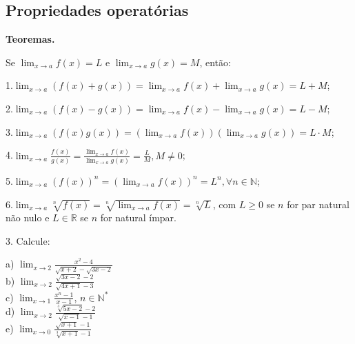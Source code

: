 \documentclass{article}
\begin{document}
{\begin{newpage}
\subsection{Propriedades operatórias}
\textbf{Teoremas.}
\par
\vspace{0.3cm}
Se $\displaystyle{\lim_{x\to a} f(x) = L}$ e $\displaystyle{\lim_{x\to a} g(x) = M}$, então:
\par
\vspace{0.2cm}
1.$\displaystyle{\lim_{x\to a} (f(x) + g(x)) = \lim_{x\to a} f(x) + \lim_{x\to a} g(x) = L + M}$;
\par
\vspace{0.2cm}
2.$\displaystyle{\lim_{x\to a} (f(x) - g(x)) = \lim_{x\to a} f(x) - \lim_{x\to a} g(x) = L - M}$;
\par
\vspace{0.2cm}
3.$\displaystyle{\lim_{x\to a} (f(x)g(x)) = (\lim_{x\to a} f(x))(\lim_{x\to a} g(x)) = L\cdot M}$;
\par
\vspace{0.2cm}
4.$\displaystyle{\lim_{x\to a} \frac{f(x)}{g(x)} = \frac{\lim_{x\to a} f(x)}{\lim_{x\to a} g(x)} = \frac{L}{M}, M\neq 0}$;
\par
\vspace{0.2cm}
5.$\displaystyle{\lim_{x\to a} (f(x))^n = (\lim_{x\to a} f(x))^n = L^n, \forall n\in\mathbb{N}}$;
\par
\vspace{0.2cm}
6.$\displaystyle{\lim_{x\to a} \sqrt[n]{f(x)} = \sqrt[n]{\lim_{x\to a} f(x)} = \sqrt[n]{L}}$, com $L\geq 0$ se $n$ for par natural não nulo e $L\in\mathbb{R}$ se $n$ for natural ímpar.
\vspace{0.2cm}
\par
\begin{flushleft}
3. Calcule:
\end{flushleft}
\begin{multicols}{3}
\hspace{-15pt}a) $\displaystyle{\lim_{x\to 2} \frac{x^2 - 4}{\sqrt{x+2} - \sqrt{3x-2}}}$\\
b) $\displaystyle{\lim_{x\to 2} \frac{\sqrt{3x - 2} - 2}{\sqrt{4x + 1} - 3}}$\\
c) $\displaystyle{\lim_{x\to 1} \frac{x^n - 1}{x - 1}}$, $n\in\mathbb{N^*}$   \\
d) $\displaystyle{\lim_{x\to 2} \frac{\sqrt[3]{5x - 2} - 2}{\sqrt{x - 1} - 1}}$\\
e) $\displaystyle{\lim_{x\to 0} \frac{\sqrt{x+1} - 1}{\sqrt[3]{x+1} - 1}}$

\end{multicols}
\end{newpage}}
\end{document}
